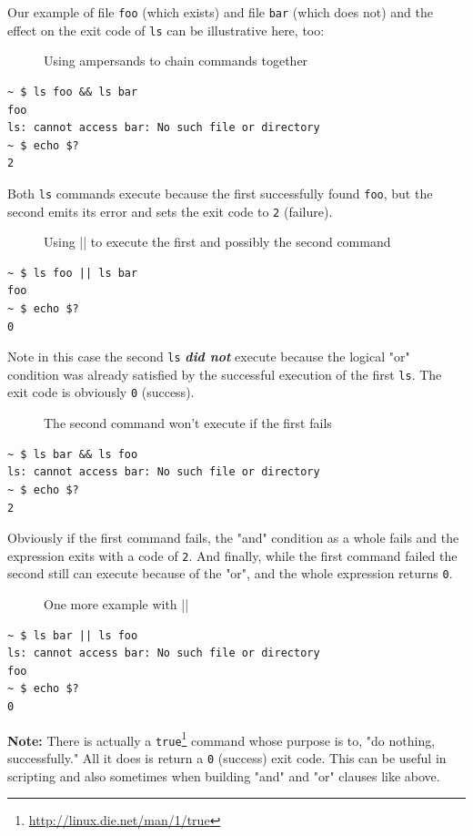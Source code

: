 \documentclass[10pt,]{book}
\renewcommand{\href}[2]{#2\footnote{\url{#1}}}
\numberwithin{figure}{chapter}
\DeclareRobustCommand{\drcap}[1]{\begin{figure}[H]\caption{#1}\end{figure}}
\DeclareRobustCommand{\drcmd}[1]{\index{Commands!#1}}
\begin{document}
Our example of file \texttt{foo} (which exists) and file \texttt{bar}
(which does not) and the effect on the exit code of \texttt{ls} can be
illustrative here, too:

\drcap{Using ampersands to chain commands together}

\begin{verbatim}
~ $ ls foo && ls bar
foo
ls: cannot access bar: No such file or directory
~ $ echo $?
2
\end{verbatim}

Both \texttt{ls} commands execute because the first successfully found
\texttt{foo}, but the second emits its error and sets the exit code to
\texttt{2} (failure).

\drcap{Using || to execute the first and possibly the second command}

\begin{verbatim}
~ $ ls foo || ls bar
foo
~ $ echo $?
0
\end{verbatim}

Note in this case the second \texttt{ls} \textbf{\emph{did not}} execute
because the logical "or" condition was already satisfied by the
successful execution of the first \texttt{ls}. The exit code is
obviously \texttt{0} (success).

\drcap{The second command won't execute if the first fails}

\begin{verbatim}
~ $ ls bar && ls foo
ls: cannot access bar: No such file or directory
~ $ echo $?
2
\end{verbatim}

Obviously if the first command fails, the "and" condition as a whole
fails and the expression exits with a code of \texttt{2}. And finally,
while the first command failed the second still can execute because of
the "or", and the whole expression returns \texttt{0}.

\drcap{One more example with ||}

\begin{verbatim}
~ $ ls bar || ls foo
ls: cannot access bar: No such file or directory
foo
~ $ echo $?
0
\end{verbatim}

\textbf{Note:} There is actually a
\href{http://linux.die.net/man/1/true}{\texttt{true}}\drcmd{true}
command whose purpose is to, "do nothing, successfully." All it does is
return a \texttt{0} (success) exit code. This can be useful in scripting
and also sometimes when building "and" and "or" clauses like above.
\end{document}

